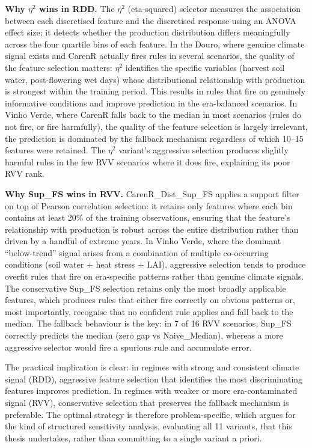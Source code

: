 \textbf{Why $\eta$$^2$ wins in RDD. }The $\eta$$^2$ (eta-squared) selector measures the association between each discretised feature and the discretised response using an ANOVA effect size; it detects whether the production distribution differs meaningfully across the four quartile bins of each feature. In the Douro, where genuine climate signal exists and CarenR actually fires rules in several scenarios, the quality of the feature selection matters: $\eta$$^2$ identifies the specific variables (harvest soil water, post-flowering wet days) whose distributional relationship with production is strongest within the training period. This results in rules that fire on genuinely informative conditions and improve prediction in the era-balanced scenarios. In Vinho Verde, where CarenR falls back to the median in most scenarios (rules do not fire, or fire harmfully), the quality of the feature selection is largely irrelevant, the prediction is dominated by the fallback mechanism regardless of which 10--15 features were retained. The $\eta$$^2$ variant's aggressive selection produces slightly harmful rules in the few RVV scenarios where it does fire, explaining its poor RVV rank.

\textbf{Why Sup\_FS wins in RVV. }CarenR\_Dist\_Sup\_FS applies a support filter on top of Pearson correlation selection: it retains only features where each bin contains at least 20\% of the training observations, ensuring that the feature's relationship with production is robust across the entire distribution rather than driven by a handful of extreme years. In Vinho Verde, where the dominant ``below-trend'' signal arises from a combination of multiple co-occurring conditions (soil water + heat stress + LAI), aggressive selection tends to produce overfit rules that fire on era-specific patterns rather than genuine climate signals. The conservative Sup\_FS selection retains only the most broadly applicable features, which produces rules that either fire correctly on obvious patterns or, most importantly, recognise that no confident rule applies and fall back to the median. The fallback behaviour is the key: in 7 of 16 RVV scenarios, Sup\_FS correctly predicts the median (zero gap vs Naive\_Median), whereas a more aggressive selector would fire a spurious rule and accumulate error.

The practical implication is clear: in regimes with strong and consistent climate signal (RDD), aggressive feature selection that identifies the most discriminating features improves prediction. In regimes with weaker or more era-contaminated signal (RVV), conservative selection that preserves the fallback mechanism is preferable. The optimal strategy is therefore problem-specific, which argues for the kind of structured sensitivity analysis, evaluating all 11 variants, that this thesis undertakes, rather than committing to a single variant a priori.


